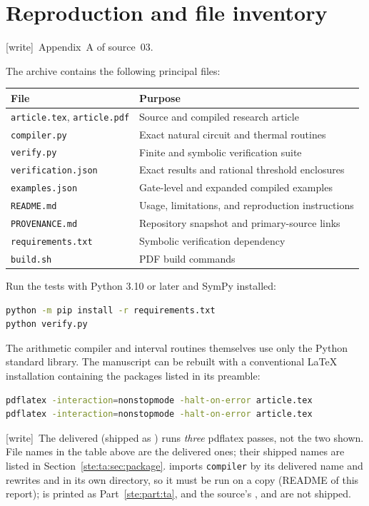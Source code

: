 \documentclass[11pt,letterpaper]{article}
\theoremstyle{definition}
\theoremstyle{remark}
\newcommand{\wtag}{\textup{[write]}}
\begin{document}
\section{Reproduction and file inventory}\label{ste:ta:app:reproduction}

\noindent\wtag\ Appendix~A of source~03.

The archive contains the following principal files:
\begin{center}\small
\begin{tabular}{ll}
\toprule
File & Purpose\\
\midrule
\texttt{article.tex}, \texttt{article.pdf} & Source and compiled research article\\
\texttt{compiler.py} & Exact natural circuit and thermal routines\\
\texttt{verify.py} & Finite and symbolic verification suite\\
\texttt{verification.json} & Exact results and rational threshold enclosures\\
\texttt{examples.json} & Gate-level and expanded compiled examples\\
\texttt{README.md} & Usage, limitations, and reproduction instructions\\
\texttt{PROVENANCE.md} & Repository snapshot and primary-source links\\
\texttt{requirements.txt} & Symbolic verification dependency\\
\texttt{build.sh} & PDF build commands\\
\bottomrule
\end{tabular}
\end{center}
Run the tests with Python 3.10 or later and SymPy installed:
\begin{lstlisting}[language=bash]
python -m pip install -r requirements.txt
python verify.py
\end{lstlisting}
The arithmetic compiler and interval routines themselves use only the Python standard library. The manuscript can be rebuilt with a conventional LaTeX installation containing the packages listed in its preamble:
\begin{lstlisting}[language=bash]
pdflatex -interaction=nonstopmode -halt-on-error article.tex
pdflatex -interaction=nonstopmode -halt-on-error article.tex
\end{lstlisting}
\wtag\ The delivered  (shipped as ) runs \emph{three} pdflatex passes, not the two shown. File names in the table above are the delivered ones; their shipped names are listed in Section~\ref{ste:ta:sec:package}.  imports \texttt{compiler} by its delivered name and rewrites  and  in its own directory, so it must be run on a copy (README of this report);  is printed as Part~\ref{ste:part:ta}, and the source's ,  and  are not shipped.
\end{document}
